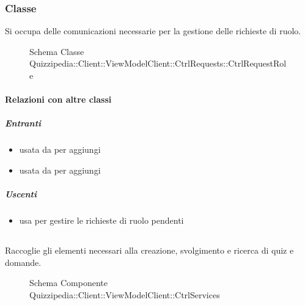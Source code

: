 \subsubsection{Classe }
Si occupa delle comunicazioni necessarie per la gestione delle richieste di ruolo.
\begin{figure}[H]
\centering
\noindent{}
\caption[Schema Classe CtrlRequestRole]{Schema Classe Quizzipedia::Client::ViewModelClient::CtrlRequests::CtrlRequestRole}
\end{figure}
\paragraph{Relazioni con altre classi}
\subparagraph{Entranti}
\begin{itemize}
\item usata da  per aggiungi
\item usata da  per aggiungi
\end{itemize}
\subparagraph{Uscenti}
\begin{itemize}
\item usa  per gestire le richieste di ruolo pendenti
\end{itemize}
\subsection{}
Raccoglie gli elementi necessari alla creazione, svolgimento e ricerca di quiz e domande.
\begin{figure}[H]
\centering
\noindent{}
\caption[Schema Componente Quizzipedia::Client::ViewModelClient::CtrlServices]{Schema Componente Quizzipedia::Client::ViewModelClient::CtrlServices}
\end{figure}
